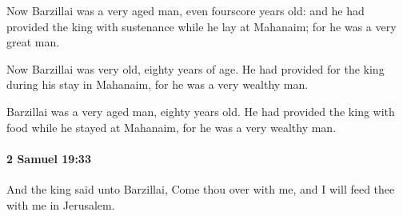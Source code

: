 			\begin{versebox}
					\item[BHS] 
					\item[ASV] Now Barzillai was a very aged man, even fourscore years old: and he had provided the king with sustenance while he lay at Mahanaim; for he was a very great man.
					\item[NIV] Now Barzillai was very old, eighty years of age. He had provided for the king during his stay in Mahanaim, for he was a very wealthy man.
					\item[NRSV] Barzillai was a very aged man, eighty years old. He had provided the king with food while he stayed at Mahanaim, for he was a very wealthy man.
			\end{versebox}

		\paragraph{2 Samuel 19:33} %
			\label{2SAMUEL-19-33}

			And the king said unto Barzillai, Come thou over with me, and I will feed thee with me in Jerusalem.

